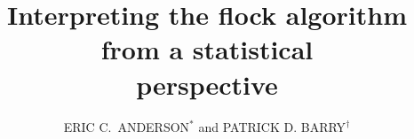 

\newcommand{\myTitle}{Interpreting the {\sc flock} algorithm from a statistical \\ perspective}
\title{\myTitle}

\newcommand{\myAuthors}{ ERIC C.~ANDERSON$^{*,\S}$ and PATRICK D. BARRY$^\dagger$}
\author{ERIC C.~ANDERSON$^{*}$ and PATRICK D. BARRY$^\dagger$}


\newcommand{\myAffiliations}{$^*$Fisheries Ecology Division, 
    Southwest Fisheries Science Center, National Marine Fisheries Service, NOAA,
    110 Shaffer Road,
    Santa Cruz, CA 95060, USA, $^\dagger$University of Alaska, Fairbanks, School of Fisheries and Ocean Science,
17101 Point Lena Loop Rd.,
Juneau, AK 99801, USA }
\renewcommand{\AuthorAddresses}{\myAffiliations}

\renewcommand{\KeyWords}{Unsupervised clustering, simulated annealing, software}

\renewcommand{\CorrespondingAuthor}{Eric C. Anderson, Fisheries Ecology Division, Southwest Fisheries Science
Center, 110 Shaffer Road, Santa Cruz, CA 95060. eric.anderson@noaa.gov}


\newcommand{\myEmailAddress}{eric.anderson@noaa.gov}
\newcommand{\myEmailFootnote}{$^\S$}

\newcommand{\myCopyright}{\copyright US Federal Government work in the public domain in the USA}

\newcommand{\myRunningTitle}{A statistical perspective on {\sc flock}}
\renewcommand{\RunningTitle}{\myRunningTitle}

\newcommand{\myRunningAuthor}{Anderson \& Barry}

